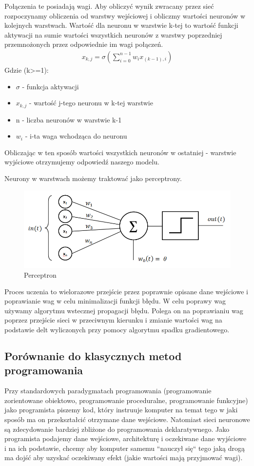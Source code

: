 \documentclass{article}
\begin{document}
Połączenia te posiadają wagi.
Aby obliczyć wynik zwracany przez sieć rozpoczynamy obliczenia od warstwy wejściowej i obliczmy wartości neuronów w kolejnych warstwach.
Wartość dla neuronu w warstwie k-tej to wartość funkcji aktywacji na sumie wartości wszystkich neuronów z warstwy poprzedniej przemnożonych przez odpowiednie im wagi połączeń.
\begin{align*}
    x_{k,j} = \sigma(\sum\limits_{i=0}^{n-1}{w_ix_{(k-1),i}})
\end{align*}
Gdzie (k>=1):
\begin{itemize}
    \item $\sigma$ - funkcja aktywacji
    \item $x_{k,j}$ - wartość j-tego neuronu w k-tej warstwie
    \item n - liczba neuronów w warstwie k-1
    \item $w_i$ - i-ta waga wchodząca do neuronu
\end{itemize}
Obliczając w ten sposób wartości wszystkich neuronów w ostatniej - warstwie wyjściowe otrzymujemy odpowiedź naszego modelu.

Neurony w warstwach możemy traktować jako perceptrony.
\begin{figure}[H]
    \centering
    \includegraphics[width=\linewidth]{"images/perceptron.png"}
    \caption{Perceptron}
\end{figure}

Proces uczenia to wielorazowe przejście przez poprawnie opisane dane wejściowe i poprawianie wag w celu minimalizacji funkcji błędu.
W celu poprawy wag używamy algorytmu wstecznej propagacji błędu.
Polega on na poprawianiu wag poprzez przejście sieci w przeciwnym kierunku i zmianie wartości wag na podstawie delt wyliczonych przy pomocy algorytmu spadku gradientowego.

\subsection{Porównanie do klasycznych metod programowania}
Przy standardowych paradygmatach programowania (programowanie zorientowane obiektowo, programowanie proceduralne, programowanie funkcyjne) jako programista piszemy kod, który
instruuje komputer na temat tego w jaki sposób ma on przekształcić otrzymane dane wejściowe.
Natomiast sieci neuronowe są zdecydowanie bardziej zbliżone do programowania deklaratywnego. Jako programista podajemy dane wejściowe, architekturę i oczekiwane dane wyjściowe i na ich podstawie, chcemy aby komputer samemu ``nauczył się`` tego jaką drogą ma dojść aby uzyskać oczekiwany efekt (jakie wartości mają przyjmować wagi).
\newpage
\end{document}
